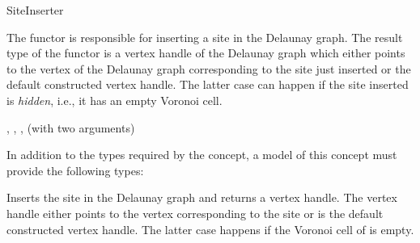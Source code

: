 

\begin{ccRefFunctionObjectConcept}{SiteInserter}

The functor  is responsible for inserting a site in
the Delaunay graph. The result type of the functor is a vertex handle
of the Delaunay graph which either points to the vertex of the
Delaunay graph corresponding to the site just inserted or the
default constructed vertex handle. The latter case can happen if the
site inserted is \textit{hidden}, i.e., it has an empty Voronoi cell.

\ccRefines
{}, , ,
 (with two arguments)

\ccTypes

In addition to the types required by the 
concept, a model of this concept must provide the following types:

\ccGlue
{}


\ccOperations

\ccThreeToTwo
{}
{Inserts the site  in the Delaunay graph  and returns a
  vertex handle. The vertex handle either points to the vertex
  corresponding to the site  or is the default constructed
  vertex handle. The latter case happens if the Voronoi cell of
   is empty.}
%


\end{ccRefFunctionObjectConcept}
